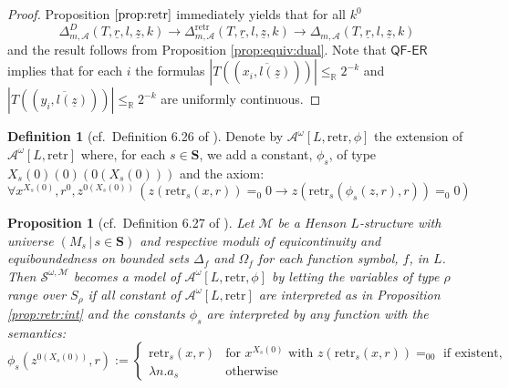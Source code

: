 \documentclass[11pt]{amsart}
\newtheorem{proposition}[theorem]{Proposition}
\theoremstyle{definition}
\newtheorem{definition}[theorem]{Definition}
\theoremstyle{remark}
\def\RR{\mathbb{R}}
\newcommand{\QFER}{\textsf{QF}\mbox{-}\textsf{ER}}
\begin{document}
\begin{proof}
 Proposition $\ref{prop:retr}$ immediately yields that for all $k^0$
\[
\Delta^D_{m,\mathcal{A}}(T,\underline{r},l,\underline{z},k) \to \Delta^\mathrm{retr}_{m,\mathcal{A}}(T,\underline{r},l,\underline{z},k) \to \Delta_{m,\mathcal{A}}(T,\underline{r},l,\underline{z},k)\tag{$\star$}
\]
and the result follows from Proposition \ref{prop:equiv:dual}. Note that $\QFER$ implies that for each $i$ the formulas $|T((\overline{x_i,l(\underline{z})}))|\leq_\RR 2^{-k}$ and $|T((\overline{y_i,l(\underline{z})}))|\leq_\RR 2^{-k}$ are uniformly continuous.
\end{proof}

\begin{definition}[cf.\ Definition 6.26 of \cite{GuK2016}]
\label{def:phi}
Denote by $\mathcal{A}^\omega[L,\mathrm{retr},\phi]$ the extension of $\mathcal{A}^\omega[L,\mathrm{retr}]$ where, for each $s\in \mathbf{S}$, we add a constant, $\phi_s$, of type $X_s(0)(0)(0(X_s(0)))$ and the axiom:
\[
   \forall x^{X_s(0)},r^0,z^{0(X_s(0))}\,(z(\mathrm{retr}_s(x,r))=_0 0 \to z(\mathrm{retr}_s(\phi_s(z,r),r))=_0 0)\tag{$\phi_s$}
\]
\end{definition}
\begin{proposition}[cf.\ Definition 6.27 of \cite{GuK2016}]
\label{prop:int:phi}
Let $\mathscr{M}$ be a Henson $L$-structure with universe $(M_s\,|\, s \in \mathbf{S})$ and respective moduli of equicontinuity and equiboundedness on
bounded sets $\Delta_f$ and $\Omega_f$ for each function symbol, $f$, in $L$. Then $\mathcal{S}^{\omega,\mathscr{M}}$ becomes a model of $\mathcal{A}^\omega[L,\mathrm{retr},\phi]$ by letting the variables of type $\rho$ range over $S_\rho$ if all constant of $\mathcal{A}^\omega[L,\mathrm{retr}]$ are interpreted as in Proposition \ref{prop:retr:int} and the constants $\phi_s$ are interpreted by any function with the
semantics:
\[
\phi_s(z^{0(X_s(0))},r):= \begin{cases}\mathrm{retr}_s(x,r)&\text{for }x^{X_s(0)}\text{ with }z(\mathrm{retr}_s(x,r))=_00\text{ if existent},\\ \lambda n. a_s&\text{otherwise}\end{cases}
\]
\end{proposition}
\end{document}
